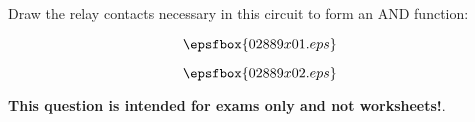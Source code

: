 

Draw the relay contacts necessary in this circuit to form an AND function:

$$\epsfbox{02889x01.eps}$$







$$\epsfbox{02889x02.eps}$$







{\bf This question is intended for exams only and not worksheets!}.




